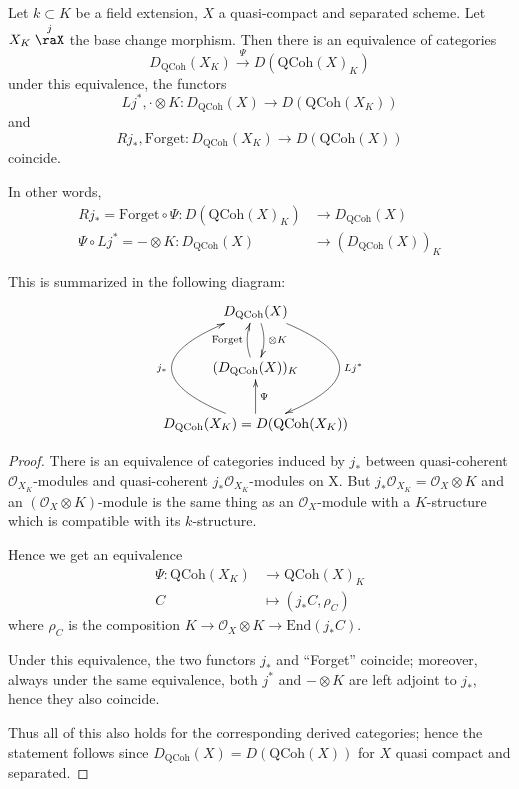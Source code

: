 \documentclass{amsart}
\begin{document}
\begin{lemma}\label{hartshorne}
Let $k\subset K$ be a field extension, $X$ a quasi-compact and separated scheme. Let $X_{K}\stackrel{j}\raX$ the base change morphism. Then there is an equivalence of categories 
$$D_{\mathrm{QCoh}}(X_{K}) \stackrel{\Psi}{\longrightarrow} D(\mathrm{QCoh}(X)_{K})$$
under this equivalence, the functors 
$$Lj^*,\cdot\otimes K:D_{\mathrm{QCoh}}(X) {\rightarrow} D(\mathrm{QCoh}(X_{K}))$$
and 
$$Rj_{*},\mathrm{Forget}: D_{\mathrm{QCoh}}(X_{K}) {\rightarrow} D(\mathrm{QCoh}(X))$$
coincide.

In other words, 
\begin{align*}
Rj_{*} =\mathrm{Forget} \circ \Psi:D(\mathrm{QCoh}(X)_{K}) &{\rightarrow} D_{\mathrm{QCoh}}(X)\\
\Psi \circ Lj^* =-\otimes K: D_{\mathrm{QCoh}}(X) &{\rightarrow} (D_{\mathrm{QCoh}}(X))_{K}
\end{align*}

This is summarized in the following diagram:
$$\xymatrix{
D_{\mathrm{QCoh}}(X) \ar@/^/ [d]^{\otimes K} \ar@/^5pc /[dd]^{Lj^*} \\
(D_{\mathrm{QCoh}}(X))_{K} \ar@/^/[u]^{\mathrm{Forget}} \\
D_{\mathrm{QCoh}}(X_{K})=D(\mathrm{QCoh}(X_{K})) \ar[u]_{\Psi} \ar@/^5pc/ [uu]^{j_{*}}
}$$
\end{lemma}

\begin{proof}
There is an equivalence of categories induced by $j_{*}$ between quasi-coherent ${\mathcal{O}}_{X_{K}}$-modules and quasi-coherent $j_{*} {\mathcal{O}}_{X_{K}}$-modules on X. But $j_{*} {\mathcal{O}}_{X_{K}}={\mathcal{O}}_{X}\otimes K$ and an $({\mathcal{O}}_{X}\otimes K)$-module is the same thing as an ${\mathcal{O}}_{X}$-module with a $K$-structure which is compatible with its $k$-structure.

Hence we get an equivalence
\begin{align*}
\Psi: \mathrm{QCoh}(X_{K}) &\to \text{QCoh}(X)_{K} \\
C &\mapsto (j_{*}C,\rho_{C})
\end{align*}
where $\rho_{C}$ is the composition $K\to {\mathcal{O}}_{X}\otimes K\to \mathrm{End}(j_{*}C)$.

Under this equivalence, the two functors $j_{*}$ and ``Forget'' coincide; moreover, always under the same equivalence, both $j^{*}$ and $-\otimes K$ are left adjoint to $j_{*}$, hence they also coincide.

Thus all of this also holds for the corresponding derived categories; hence the statement follows since $D_{\mathrm{QCoh}}(X) =D(\mathrm{QCoh}(X))$ for $X$ quasi compact and separated.
\end{proof}
\end{document}
